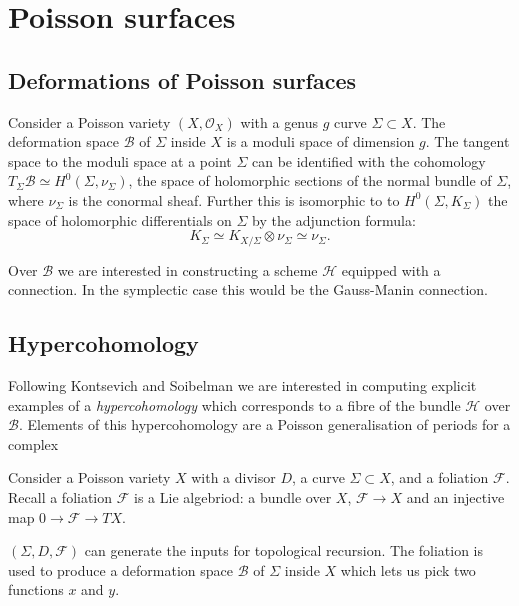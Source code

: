 \chapter{Poisson surfaces}

\section{Deformations of Poisson surfaces}

    Consider a Poisson variety \( (X,\mathcal{O}_X)\) with a genus \(g\) curve \(\Sigma \subset X\). The deformation space \( \mathcal{B}\) of \( \Sigma\) inside \(X\) is a moduli space of dimension \(g\). The tangent space to the moduli space at a point \(\Sigma\) can be identified with the cohomology \(T_\Sigma \mathcal{B} \simeq H^0(\Sigma, \nu_\Sigma)\), the space of holomorphic sections of the normal bundle of \( \Sigma\), where \( \nu_\Sigma\) is the conormal sheaf. Further this is isomorphic to to \( H^{0}(\Sigma, K_\Sigma)\) the space of holomorphic differentials on \( \Sigma\) by the adjunction formula:
    \[ K_\Sigma \simeq K_{X/\Sigma} \otimes \nu_\Sigma \simeq \nu_\Sigma. \]
    
    Over \( \mathcal{B}\) we are interested in constructing a scheme \( \mathcal{H}\) equipped with a connection. In the symplectic case this would be the Gauss-Manin connection.

\section{Hypercohomology}

    Following Kontsevich and Soibelman we are interested in computing explicit examples of a \emph{hypercohomology} which corresponds to a fibre of the bundle \( \mathcal{H}\) over \(\mathcal{B}\). Elements of this hypercohomology are a Poisson generalisation of periods for a complex

    Consider a Poisson variety \(X\) with a divisor \(D\), a curve \(\Sigma \subset X\), and a foliation \(\mathcal{F}\). Recall a foliation \( \mathcal{F}\) is a Lie algebriod: a bundle over \(X\), \( \mathcal{F} \rightarrow X \) and an injective map \(  0 \rightarrow \mathcal{F} \rightarrow T X\). 

    \((\Sigma, D, \mathcal{F}) \) can generate the inputs for topological recursion. The foliation is used to produce a deformation space \( \mathcal{B}\) of \( \Sigma \) inside \(X\) which lets us pick two functions \(x\) and \(y\).


